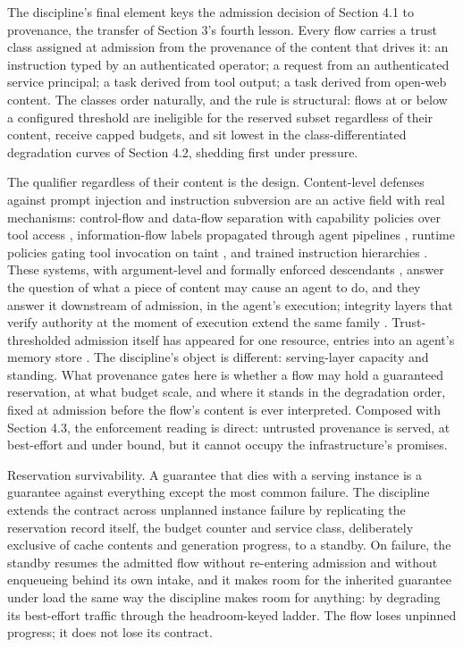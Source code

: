 The discipline's final element keys the admission decision of Section 4.1
to provenance, the transfer of Section 3's fourth lesson. Every flow
carries a trust class assigned at admission from the provenance of the
content that drives it: an instruction typed by an authenticated
operator; a request from an authenticated service principal; a task
derived from tool output; a task derived from open-web content. The
classes order naturally, and the rule is structural: flows at or below a
configured threshold are ineligible for the reserved subset regardless of
their content, receive capped budgets, and sit lowest in the
class-differentiated degradation curves of Section 4.2, shedding first
under pressure.

The qualifier regardless of their content is the design. Content-level
defenses against prompt injection and instruction subversion are an
active field with real mechanisms: control-flow and data-flow separation
with capability policies over tool access \citep{camel2025}, information-flow
labels propagated through agent pipelines \citep{fides2025}, runtime policies
gating tool invocation on taint \citep{rtbas2025}, and trained instruction
hierarchies \citep{wallace2024}. These systems, with argument-level and
formally enforced descendants \citep{pact2026,provgates2026}, answer the
question of what a piece of content may cause an agent to do, and they
answer it downstream of admission, in the agent's execution; integrity
layers that verify authority at the moment of execution extend the same
family \citep{cxi2026}. Trust-thresholded admission itself has appeared for one
resource, entries into an agent's memory store \citep{memcurate2026}. The
discipline's object is different: serving-layer capacity and standing.
What provenance gates here is whether a flow may hold a guaranteed
reservation, at what budget scale, and where it stands in the degradation
order, fixed at admission before the flow's content is ever interpreted.
Composed with Section 4.3, the enforcement reading is direct: untrusted
provenance is served, at best-effort and under bound, but it cannot
occupy the infrastructure's promises.

Reservation survivability. A guarantee that dies with a serving instance
is a guarantee against everything except the most common failure. The
discipline extends the contract across unplanned instance failure by
replicating the reservation record itself, the budget counter and service
class, deliberately exclusive of cache contents and generation progress,
to a standby. On failure, the standby resumes the admitted flow without
re-entering admission and without enqueueing behind its own intake, and
it makes room for the inherited guarantee under load the same way the
discipline makes room for anything: by degrading its best-effort traffic
through the headroom-keyed ladder. The flow loses unpinned progress; it
does not lose its contract.
